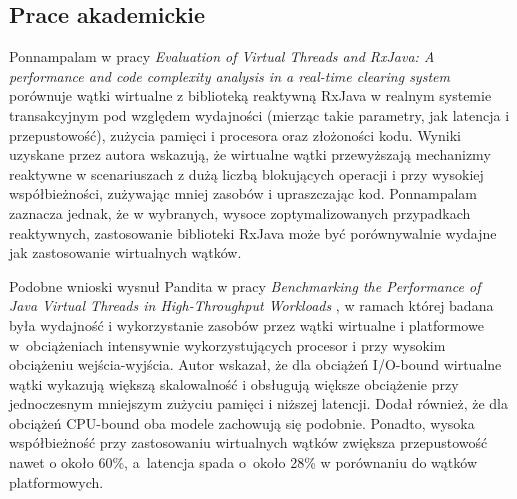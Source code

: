 \subsection{Prace akademickie}
Ponnampalam w pracy \textit{Evaluation of Virtual Threads and RxJava: A performance and code complexity analysis in a real-time clearing system} \cite{ponnampalam2025} porównuje wątki wirtualne z biblioteką reaktywną RxJava w realnym systemie transakcyjnym pod względem wydajności (mierząc takie parametry, jak latencja i przepustowość), zużycia pamięci i procesora oraz złożoności kodu.
Wyniki uzyskane przez autora wskazują, że wirtualne wątki przewyższają mechanizmy reaktywne w scenariuszach z dużą liczbą blokujących operacji i przy wysokiej współbieżności, zużywając mniej zasobów i upraszczając kod. Ponnampalam zaznacza jednak, że w wybranych, wysoce zoptymalizowanych przypadkach reaktywnych, zastosowanie biblioteki RxJava może być porównywalnie wydajne jak zastosowanie wirtualnych wątków.

Podobne wnioski wysnuł Pandita w pracy \textit{Benchmarking the Performance of Java Virtual Threads in High-Throughput Workloads} \cite{pandita2024}, w ramach której badana była wydajność i wykorzystanie zasobów przez wątki wirtualne i platformowe w~obciążeniach intensywnie wykorzystujących procesor i przy wysokim obciążeniu wejścia-wyjścia. Autor wskazał, że dla obciążeń I/O-bound wirtualne wątki wykazują większą skalowalność i obsługują większe obciążenie przy jednoczesnym mniejszym zużyciu pamięci i niższej latencji.
Dodał również, że dla obciążeń CPU-bound oba modele zachowują się podobnie. Ponadto, wysoka współbieżność przy zastosowaniu wirtualnych wątków zwiększa przepustowość nawet o około 60\%, a~latencja spada o~około 28\% w porównaniu do wątków platformowych.

